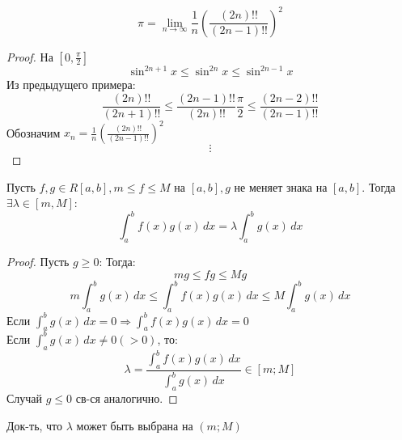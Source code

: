 \begin{example}[Ф-ла Валлиса]
  \[
  \pi = \lim_{n\to \infty} \frac{1}{n} \left(\frac{(2n)!!}{(2n - 1)!!}\right)^{2}
  \]
\end{example}
\begin{proof}
На $[0, \frac{\pi}{2}]$
\[
  \sin^{2n + 1}x \leq \sin^{2n} x \leq \sin^{2n - 1} x
\]
Из предыдущего примера:
\[
  \frac{(2n)!!}{(2n + 1)!!} \leq \frac{(2n - 1)!!}{(2n)!!}\frac{\pi}{2} \leq \frac{(2n - 2)!!}{(2n - 1)!!}
\]
Обозначим $x_n = \frac{1}{n}\left(\frac{(2n)!!}{(2n - 1)!!}\right)^{2}$
\[
\vdots
\]
\end{proof}
\begin{theorem}
\label{th:integr-mid-theorem(11)}
Пусть $f, g \in R[a, b], m \leq f \leq M$ на $[a, b], g$ не меняет знака на $[a, b]$. Тогда $\exists \lambda \in [m, M]$:
\[
  \int_{a}^{b} f(x)g(x) \, dx = \lambda \int_{a}^{b} g(x) \, dx
\]

\end{theorem}
\begin{proof}
Пусть $g \geq 0$:
Тогда:
\[
  mg \leq fg \leq Mg
\]
\[
  m \int_{a}^{b} g(x) \, dx \leq \int_{a}^{b} f(x)g(x) \, dx \leq M\int_{a}^{b} g(x) \, dx
\]
Если $\int_{a}^{b} g(x) \, dx = 0 \Rightarrow \int_{a}^{b} f(x)g(x) \, dx = 0$ \\
Если $\int_{a}^{b} g(x) \, dx \neq 0 (> 0)$, то:
\[
\lambda = \frac{\int_{a}^{b} f(x)g(x) \, dx}{\int_{a}^{b} g(x) \, dx} \in [m; M]
\]
Случай $g \leq 0$ св-ся аналогично.
\end{proof}
\begin{task}
Док-ть, что $\lambda$ может быть выбрана на $(m; M)$
\end{task}
